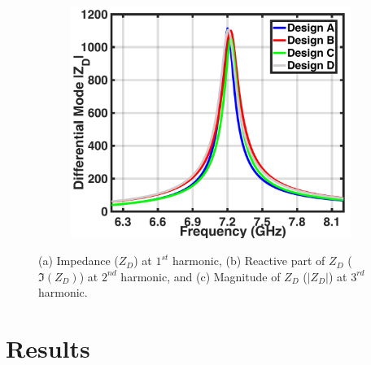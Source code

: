 \documentclass[conference]{IEEEtran}
\begin{document}
\begin{figure}[!t]
\begin{subfigure}{0.24\textwidth}
		\caption{}
		\label{fig:Comp_2H_imag}
	\end{subfigure}
	\begin{subfigure}{0.24\textwidth}
		\includegraphics[width=1\textwidth]{Images/Output_Network_Comp/Comp_3H_Mag.pdf}
		\caption{}
		\label{fig:Comp_3H_Mag}
	\end{subfigure}
	\caption{(a) Impedance ($Z_D$) at $1^{st}$ harmonic, (b) Reactive part of $Z_D$ ($\Im(Z_D)$) at $2^{nd}$ harmonic, and (c) Magnitude of $Z_D$ ($|Z_D|$) at $3^{rd}$ harmonic.}
	\label{fig:Comp_1H_2H_3H}
	\vspace{-0.1in}
\end{figure}

\section{Results}
\label{section:Results}
\end{document}

